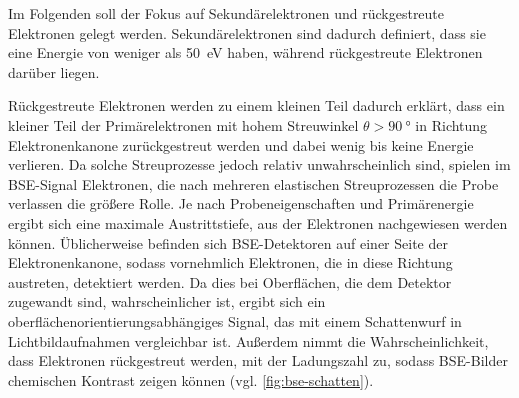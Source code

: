 Im Folgenden soll der Fokus auf Sekundärelektronen und rückgestreute Elektronen gelegt werden.
Sekundärelektronen sind dadurch definiert, dass sie eine Energie von weniger als \SI{50}{eV} haben, während rückgestreute Elektronen darüber liegen.

Rückgestreute Elektronen werden zu einem kleinen Teil dadurch erklärt, dass ein kleiner Teil der Primärelektronen mit hohem Streuwinkel $\theta > \SI{90}{\degree}$ in Richtung Elektronenkanone zurückgestreut werden und dabei wenig bis keine Energie verlieren.
Da solche Streuprozesse jedoch relativ unwahrscheinlich sind, spielen im BSE-Signal Elektronen, die nach mehreren elastischen Streuprozessen die Probe verlassen die größere Rolle.
Je nach Probeneigenschaften und Primärenergie ergibt sich eine maximale Austrittstiefe, aus der Elektronen nachgewiesen werden können.
Üblicherweise befinden sich BSE-Detektoren auf einer Seite der Elektronenkanone, sodass vornehmlich Elektronen, die in diese Richtung austreten, detektiert werden.
Da dies bei Oberflächen, die dem Detektor zugewandt sind, wahrscheinlicher ist, ergibt sich ein oberflächenorientierungsabhängiges Signal, das mit einem Schattenwurf in Lichtbildaufnahmen vergleichbar ist.
Außerdem nimmt die Wahrscheinlichkeit, dass Elektronen rückgestreut werden, mit der Ladungszahl zu, sodass BSE-Bilder chemischen Kontrast zeigen können (vgl. \cref{fig:bse-schatten}).

